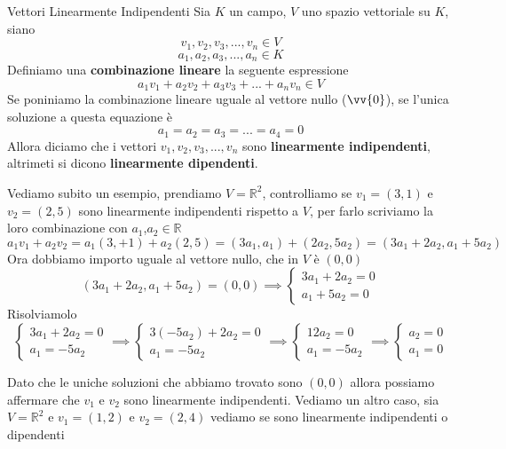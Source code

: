 \documentclass{rapport}
\begin{document}
\begin{definizione}{Vettori Linearmente Indipendenti}{}
  Sia $K$ un campo, $V$ uno spazio vettoriale su $K$, siano
  \[
  v_1, v_2, v_3, ..., v_n \in V
  \]
  \[
  a_1, a_2,a_3,...,a_n \in K
  \]
  Definiamo una \textbf{combinazione lineare} la seguente espressione
  \[
  a_1v_1 + a_2v_2 + a_3v_3 + ... + a_nv_n \in V
  \]
  Se poniniamo la combinazione lineare uguale al vettore nullo ($\vv{0}$), se l'unica soluzione a questa equazione è 
  \[
  a_1=a_2=a_3=...=a_4=0
  \] 
  Allora diciamo che i vettori $v_1, v_2, v_3, ..., v_n$ sono \textbf{linearmente indipendenti}, altrimeti si dicono \textbf{linearmente dipendenti}.
\end{definizione}
\newpage
Vediamo subito un esempio, prendiamo $V= \mathbb{R}^2$, controlliamo se $v_1=(3,1)$ e $v_2=(2,5)$ sono linearmente indipendenti rispetto a $V$, per farlo scriviamo la loro combinazione con $a_1$,$a_2\in \mathbb{R}$
\[
a_1v_1 + a_2v_2 = a_1(3,+1) + a_2(2,5) = (3a_1,a_1)+(2a_2, 5a_2) = (3a_1+2a_2, a_1+5a_2)
\] 
Ora dobbiamo importo uguale al vettore nullo, che in $V$ è $(0,0)$
\[
(3a_1+2a_2, a_1+5a_2) = (0,0) \implies \begin{cases}
  3a_1+2a_2 = 0 \\
  a_1+5a_2 = 0
\end{cases}
\]
Risolviamolo
\[
\begin{cases}
  3a_1+2a_2 = 0 \\
  a_1 = -5a_2
\end{cases}\implies
\begin{cases}
  3(-5a_2)+2a_2 = 0 \\
  a_1 = -5a_2
\end{cases} \implies
\begin{cases}
  12a_2 = 0 \\
  a_1 = -5a_2
\end{cases} \implies
\begin{cases}
  a_2 = 0 \\
  a_1 = 0
\end{cases}
\]

Dato che le uniche soluzioni che abbiamo trovato sono $(0,0)$ allora possiamo affermare che $v_1$ e $v_2$ sono linearmente indipendenti. Vediamo un altro caso, sia $V=\mathbb{R}^2$ e $v_1=(1,2)$ e $v_2=(2,4)$ vediamo se sono linearmente indipendenti o dipendenti
\end{document}
